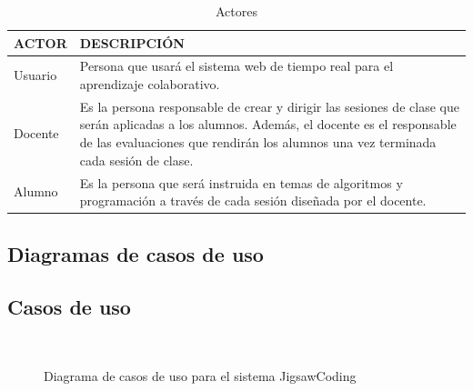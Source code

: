 \begin{longtable}{L{3cm}L{7cm}}
\caption{Actores}
\label{tab:actores}\\
    \toprule[0.8mm]
    ACTOR & DESCRIPCIÓN \\
    \midrule[0.6mm]
    Usuario & Persona que usará el sistema web de tiempo real para el aprendizaje colaborativo.\\
    \midrule
    Docente & Es la persona responsable de crear y dirigir las sesiones de clase que serán aplicadas a los alumnos. Además, el docente es el responsable de las evaluaciones que rendirán los alumnos una vez terminada cada sesión de clase.\\
    \midrule
    Alumno & Es la persona que será instruida en temas de algoritmos y programación a través de cada sesión diseñada por el docente.\\
    \bottomrule[0.8mm]
\end{longtable}
\clearpage
\begin{landscape}
\section{Diagramas de casos de uso}
\subsection{Casos de uso}
\begin{figure}[!h]
  \centering
  \\
  \caption[Casos de uso]{Diagrama de casos de uso para el sistema JigsawCoding}
  \label{fig:casos_de_uso}
\end{figure}
\end{landscape}
\clearpage
